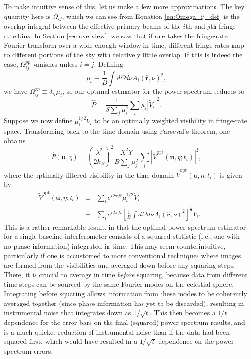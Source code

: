 \documentclass[twocolumn,apj,numberedappendix]{emulateapj}
\newcommand{\rhat}{\hat{\mathbf{r}}}
\begin{document}
To make intuitive sense of this, let us make a few more approximations. The key quantity here is $\Omega_{ij}$, which we can see from Equation \eqref{eq:Omega_ij_def} is the overlap integral between the effective primary beams of the $i$th and $j$th fringe-rate bins. In Section \ref{sec:overview}, we saw that if one takes the fringe-rate Fourier transform over a wide enough window in time, different fringe-rates map to different portions of the sky with relatively little overlap. If this is indeed the case, $\Omega_{ij}^{pp}$ vanishes unless $i=j$. Defining
\begin{equation}
\mu_i  \equiv \frac{1}{B} \int d\Omega d\nu A_i(\rhat,\nu)^2,
\end{equation}
we have $\Omega_{ij}^{pp} \equiv \delta_{ij} \mu_i$, so our optimal estimator for the power spectrum reduces to
\begin{equation}
\widehat{P} = \frac{1}{S \sum_j \mu_j^2}\sum_i \mu_i | \widetilde{V}_i |^2 .
\end{equation}
Suppose we now define $\mu_i^{1/2} \widetilde{V}_i$ to be an optimally weighted visibility in fringe-rate space. Transforming back to the time domain using Parseval's theorem, one obtains
\begin{equation}
\label{eq:finalEst}
\widehat{P}(\mathbf{u}, \eta) = \left( \frac{\lambda^2}{2 k_B} \right)^2 \frac{X^2 Y}{B\sum_j \mu_j^2} \sum_i |\widetilde{V}^\textrm{opt} (\mathbf{u}, \eta; t_i)|^2,
\end{equation}
where the optimally filtered visibility in the time domain $\widetilde{V}^\textrm{opt} (\mathbf{u}, \eta; t_i)$ is given by
\begin{eqnarray}
\widetilde{V}^\textrm{opt} (\mathbf{u}, \eta; t_i) &\equiv& \sum_i e^{i 2 \pi f t} \mu_i^{1/2} \widetilde{V}_i \nonumber \\
&=&  \sum_i e^{i 2 \pi f t} \left[\frac{1}{B} \int d\Omega d\nu A_i(\rhat,\nu)^2\right]^\frac{1}{2} \widetilde{V}_i. \qquad
\end{eqnarray}
This is a rather remarkable result, in that the optimal power spectrum estimator for a single baseline interferometer consists of a squared statistic (i.e., one with no phase information) integrated in time. This may seem counterintuitive, particularly if one is accustomed to more conventional techniques where images are formed from the visibilities and averaged down before any squaring steps. There, it is crucial to average in time \emph{before} squaring, because data from different time steps can be sourced by the same Fourier modes on the celestial sphere. Integrating before squaring allows information from these modes to be coherently averaged together (since phase information has yet to be discarded), resulting in instrumental noise that integrates down as $1/\sqrt{t}$. This then becomes a $1/t$ dependence for the error bars on the final (squared) power spectrum results, and is a much quicker reduction of instrumental noise than if the data had been squared first, which would have resulted in a $1/\sqrt{t}$ dependence on the power spectrum errors.
\end{document}

